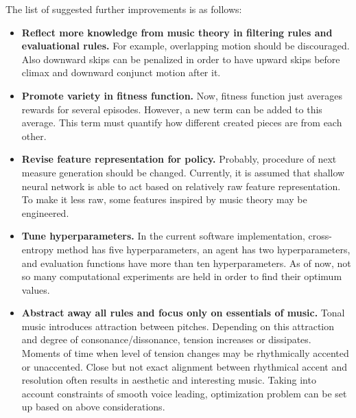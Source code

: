 \documentclass{article}
\begin{document}
The list of suggested further improvements is as follows:
\begin{itemize}
	\item \textbf{Reflect more knowledge from music theory in filtering rules and evaluational rules.} For example, overlapping motion should be discouraged. Also downward skips can be penalized in order to have upward skips before climax and downward conjunct motion after it.
	\item \textbf{Promote variety in fitness function.} Now, fitness function just averages rewards for several episodes. However, a new term can be added to this average. This term must quantify how different created pieces are from each other.
	\item \textbf{Revise feature representation for policy.} Probably, procedure of next measure generation should be changed. Currently, it is assumed that shallow neural network is able to act based on relatively raw feature representation. To make it less raw, some features inspired by music theory may be engineered.
	\item \textbf{Tune hyperparameters.} In the current software implementation, cross-entropy method has five hyperparameters, an agent has two hyperparameters, and evaluation functions have more than ten hyperparameters. As of now, not so many computational experiments are held in order to find their optimum values. 
	\item \textbf{Abstract away all rules and focus only on essentials of music.} Tonal music introduces attraction between pitches. Depending on this attraction and degree of consonance/dissonance, tension increases or dissipates. Moments of time when level of tension changes may be rhythmically accented or unaccented. Close but not exact alignment between rhythmical accent and resolution often results in aesthetic and interesting music. Taking into account constraints of smooth voice leading, optimization problem can be set up based on above considerations.
\end{itemize}


  

\end{document}
